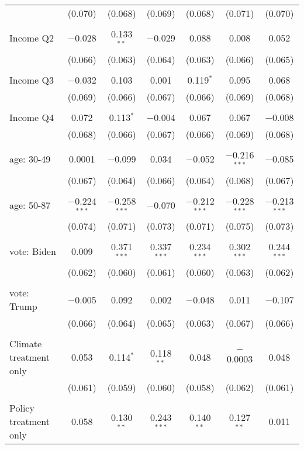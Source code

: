 \begin{tabular}{@{\extracolsep{5pt}}lcccccc}
  & (0.070) & (0.068) & (0.069) & (0.068) & (0.071) & (0.070) \\ 
  & & & & & & \\ 
 Income Q2 & $-$0.028 & 0.133$^{**}$ & $-$0.029 & 0.088 & 0.008 & 0.052 \\ 
  & (0.066) & (0.063) & (0.064) & (0.063) & (0.066) & (0.065) \\ 
  & & & & & & \\ 
 Income Q3 & $-$0.032 & 0.103 & 0.001 & 0.119$^{*}$ & 0.095 & 0.068 \\ 
  & (0.069) & (0.066) & (0.067) & (0.066) & (0.069) & (0.068) \\ 
  & & & & & & \\ 
 Income Q4 & 0.072 & 0.113$^{*}$ & $-$0.004 & 0.067 & 0.067 & $-$0.008 \\ 
  & (0.068) & (0.066) & (0.067) & (0.066) & (0.069) & (0.068) \\ 
  & & & & & & \\ 
 age: 30-49 & 0.0001 & $-$0.099 & 0.034 & $-$0.052 & $-$0.216$^{***}$ & $-$0.085 \\ 
  & (0.067) & (0.064) & (0.066) & (0.064) & (0.068) & (0.067) \\ 
  & & & & & & \\ 
 age: 50-87 & $-$0.224$^{***}$ & $-$0.258$^{***}$ & $-$0.070 & $-$0.212$^{***}$ & $-$0.228$^{***}$ & $-$0.213$^{***}$ \\ 
  & (0.074) & (0.071) & (0.073) & (0.071) & (0.075) & (0.073) \\ 
  & & & & & & \\ 
 vote: Biden & 0.009 & 0.371$^{***}$ & 0.337$^{***}$ & 0.234$^{***}$ & 0.302$^{***}$ & 0.244$^{***}$ \\ 
  & (0.062) & (0.060) & (0.061) & (0.060) & (0.063) & (0.062) \\ 
  & & & & & & \\ 
 vote: Trump & $-$0.005 & 0.092 & 0.002 & $-$0.048 & 0.011 & $-$0.107 \\ 
  & (0.066) & (0.064) & (0.065) & (0.063) & (0.067) & (0.066) \\ 
  & & & & & & \\ 
 Climate treatment only & 0.053 & 0.114$^{*}$ & 0.118$^{**}$ & 0.048 & $-$0.0003 & 0.048 \\ 
  & (0.061) & (0.059) & (0.060) & (0.058) & (0.062) & (0.061) \\ 
  & & & & & & \\ 
 Policy treatment only & 0.058 & 0.130$^{**}$ & 0.243$^{***}$ & 0.140$^{**}$ & 0.127$^{**}$ & 0.011 \\ 

\end{tabular}
